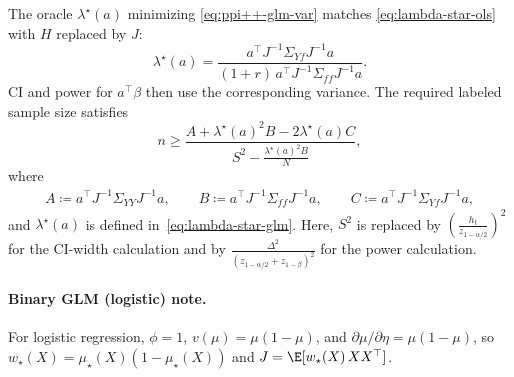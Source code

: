 The oracle $\lambda^\star(a)$ minimizing \eqref{eq:ppi++-glm-var} matches \eqref{eq:lambda-star-ols} with $H$ replaced by $J$:
\begin{equation}\label{eq:lambda-star-glm}
\lambda^\star(a)
=
\frac{a^\top J^{-1}\Sigma_{Yf}J^{-1}a}{(1+r)\,a^\top J^{-1}\Sigma_{ff}J^{-1}a}.
\end{equation}
CI and power for $a^\top\beta$ then use the corresponding variance. The required labeled sample size satisfies
\begin{equation}
\label{eq:n-for-glm}
    n\geq \frac{A+\lambda^\star(a)^2  B-2\lambda^\star(a) C}{S^2-\frac{\lambda^\star(a)^2  B}{N}},
\end{equation}where \begin{align*}
A\coloneqq a^\top J^{-1}\Sigma_{YY}J^{-1}a,\qquad
B\coloneqq a^\top J^{-1}\Sigma_{ff}J^{-1}a,\qquad
C\coloneqq a^\top J^{-1}\Sigma_{Yf}J^{-1}a,
\end{align*} and $\lambda^\star(a)$ is defined in~\eqref{eq:lambda-star-glm}. Here, $S^2$ is replaced by $\left(\frac{h_t}{z_{1-\alpha/2}}\right)^2$ for the CI-width calculation and by $\frac{\Delta^2}{(z_{1-\alpha/2}+z_{1-\beta})^2}$ for the power calculation.

\paragraph{Binary GLM (logistic) note.}
For logistic regression, $\phi=1$, $v(\mu)=\mu(1-\mu)$, and $\partial\mu/\partial\eta=\mu(1-\mu)$, so $w_\star(X)=\mu_\star(X)(1-\mu_\star(X))$ and $J=\E[w_\star(X)\,XX^\top]$.


